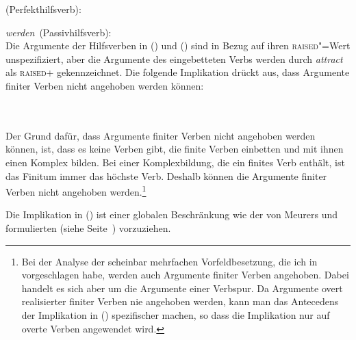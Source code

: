 {\eas
\mbox{\haben (Perfekthilfsverb):}\\
\zs

\eas
\label{le-werden-passive-da-spirits}
\mbox{\emph{werden} (Passivhilfsverb):}\\
\zs
Die Argumente der Hilfsverben in () und () sind in Bezug auf ihren \textsc{raised}"=Wert
unspezifiziert, aber die Argumente des eingebetteten Verbs werden durch \emph{attract}
als \textsc{raised}+ gekennzeichnet. Die folgende Implikation drückt aus, dass Argumente finiter
Verben nicht angehoben werden können:

\eas
{} \impl \\\\
\mbox{}\hspace{6em}
\zs
Der Grund dafür, dass Argumente finiter Verben nicht angehoben werden können,
ist, dass es keine Verben gibt, die finite Verben einbetten und mit ihnen einen Komplex bilden.
Bei einer Komplexbildung, die ein finites Verb enthält, ist das Finitum immer das höchste
Verb. Deshalb können die Argumente finiter Verben nicht angehoben werden.\footnote{
  Bei der Analyse der scheinbar mehrfachen Vorfeldbesetzung, die ich in 
  vorgeschlagen habe, werden auch Argumente finiter Verben angehoben. Dabei handelt es sich aber um
  die Argumente einer Verbspur. Da Argumente overt realisierter finiter Verben nie angehoben werden,
  kann man das Antecedens der Implikation in () spezifischer machen, so dass die Implikation
  nur auf overte Verben angewendet wird.%
}

Die Implikation in () ist einer globalen Beschränkung wie der von Meurers und \prz
formulierten (siehe Seite~\pageref{raised-wert}) vorzuziehen.

}
